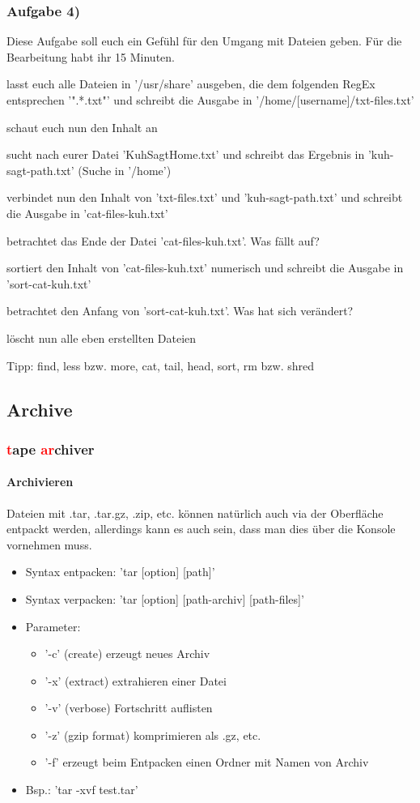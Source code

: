 \documentclass[12pt,utf8, handout]{beamer}
\begin{document}
\begin{frame}
\frametitle{Aufgabe 4)}
Diese Aufgabe soll euch ein Gefühl für den Umgang mit Dateien geben. Für die Bearbeitung habt ihr 15 Minuten.
\begin{itemize}
	{\footnotesize
	\item lasst euch alle Dateien in '/usr/share' ausgeben, die dem folgenden RegEx entsprechen '".*.txt"' und schreibt die Ausgabe in '/home/[username]/txt-files.txt'
	\item schaut euch nun den Inhalt an
	\item sucht nach eurer Datei 'KuhSagtHome.txt' und schreibt das Ergebnis in 'kuh-sagt-path.txt' (Suche in '/home')
	\item verbindet nun den Inhalt von 'txt-files.txt' und 'kuh-sagt-path.txt' und schreibt die Ausgabe in 'cat-files-kuh.txt'
	\item betrachtet das Ende der Datei 'cat-files-kuh.txt'. Was fällt auf?
	\item sortiert den Inhalt von 'cat-files-kuh.txt' numerisch und schreibt die Ausgabe in 'sort-cat-kuh.txt'
	\item betrachtet den Anfang von 'sort-cat-kuh.txt'. Was hat sich verändert?
	\item löscht nun alle eben erstellten Dateien
	}
\end{itemize}
{\scriptsize Tipp: find, less bzw. more, cat, tail, head, sort, rm bzw. shred}
\end{frame}


\subsection{Archive}
\begin{frame}
\frametitle{\textcolor{red}{t}ape \textcolor{red}{ar}chiver}
\framesubtitle{\textcolor{ownDarkOr}{Archivieren}}
Dateien mit .tar, .tar.gz, .zip, etc. können natürlich auch via der Oberfläche entpackt werden, allerdings kann es auch sein, dass man dies über die Konsole vornehmen muss.
\begin{itemize}[<+->]
	\item Syntax entpacken: 'tar [option] [path]'
	\item Syntax verpacken: 'tar [option] [path-archiv] [path-files]'
	\item Parameter:
	\begin{itemize}[<+->]
		\item {\scriptsize '-c' (create) erzeugt neues Archiv}
		\item {\scriptsize '-x' (extract) extrahieren einer Datei}
		\item {\scriptsize '-v' (verbose) Fortschritt auflisten}
		\item {\scriptsize '-z' (gzip format) komprimieren als .gz, etc.}
		\item {\scriptsize '-f' erzeugt beim Entpacken einen Ordner mit Namen von Archiv}
	\end{itemize}
	\item Bsp.: 'tar -xvf test.tar'
\end{itemize}
\end{frame}
\end{document}
